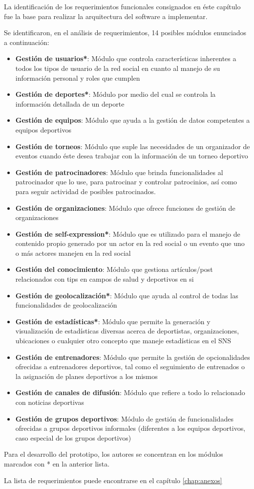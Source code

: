 La identificación de los requerimientos funcionales consignados en éste capítulo fue la base para realizar la arquitectura del software a implementar.

Se identificaron, en el análisis de requerimientos, 14 posibles módulos enunciados a continuación:

\begin{itemize}
	\item \textbf{Gestión de usuarios*}: Módulo que controla características inherentes a todos los tipos de usuario de la red social en cuanto al manejo de su información personal y roles que cumplen
	\item \textbf{Gestión de deportes*}: Módulo por medio del cual se controla la información detallada de un deporte
	\item \textbf{Gestión de equipos}: Módulo que ayuda a la gestión de datos competentes a equipos deportivos
	\item \textbf{Gestión de torneos}: Módulo que suple las necesidades de un organizador de eventos cuando éste desea trabajar con la información de un torneo deportivo
	\item \textbf{Gestión de patrocinadores}: Módulo que brinda funcionalidades al patrocinador que lo use, para patrocinar y controlar patrocinios, así como para seguir actividad de posibles patrocinados.
	\item \textbf{Gestión de organizaciones}: Módulo que ofrece funciones de gestión de organizaciones
	\item \textbf{Gestión de self-expression*}: Módulo que es utilizado para el manejo de contenido propio generado por un actor en la red social o un evento que uno o más actores manejen en la red social
	\item \textbf{Gestión del conocimiento}: Módulo que gestiona artículos/post relacionados con tips en campos de salud y deportivos en si
	\item \textbf{Gestión de geolocalización*}: Módulo que ayuda al control de todas las funcionalidades de geolocalización
	\item \textbf{Gestión de estadísticas*}: Módulo que permite la generación y visualización de estadísticas diversas acerca de deportistas, organizaciones, ubicaciones o cualquier otro concepto que maneje estadísticas en el SNS
	\item \textbf{Gestión de entrenadores}: Módulo que permite la gestión de opcionalidades ofrecidas a entrenadores deportivos, tal como el seguimiento de entrenados o la asignación de planes deportivos a los mismos
	\item \textbf{Gestión de canales de difusión}: Módulo que refiere a todo lo relacionado con noticias deportivas
	\item \textbf{Gestión de grupos deportivos}:  Módulo de gestión de funcionalidades ofrecidas a grupos deportivos informales (diferentes a los equipos deportivos, caso especial de los grupos deportivos)
\end{itemize}

Para el desarrollo del prototipo, los autores se concentran en los módulos marcados con * en la anterior lista.

La lista de requerimientos puede encontrarse en el capítulo \ref{chap:anexos}
